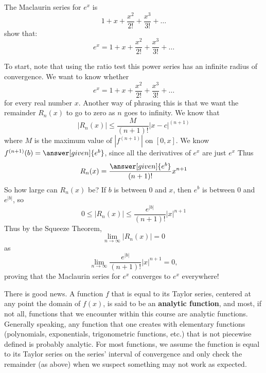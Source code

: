 \documentclass{ximera}
\begin{document}
\begin{example}
	The Maclaurin series for $e^x$ is 
	\[
	1+x+\frac{x^2}{2!} +\frac{x^3}{3!}+\dots
	\]
        show that:
        \[
        e^x = 1+x+\frac{x^2}{2!} +\frac{x^3}{3!}+\dots
        \]
	\begin{explanation}
	  To start, note that using the ratio test this power series
          has an infinite radius of convergence.  We want to know
          whether
          \[
          e^x = 1+x+\frac{x^2}{2!} +\frac{x^3}{3!}+\dots
          \]
          for every real number $x$.  Another way of phrasing this is
          that we want the remainder $R_n(x)$ to go to zero as $n$
          goes to infinity. We know that
          \[
          \left|R_n(x)\right| \le \frac{M}{(n+1)!}|x-c|^{(n+1)}
          \]
          where $M$ is the maximum value of $|f^{(n+1)}|$ on $[0,x]$.
          We know $f^{(n+1)}(b) = \answer[given]{e^b}$, since all the
          derivatives of $e^x$ are just $e^x$ Thus
	  \[
	  R_n(x) = \frac{\answer[given]{e^b}}{(n+1)!}x^{n+1}
	  \]
	  So how large can $R_n(x)$ be?  If $b$ is between $0$ and
          $x$, then $e^b$ is between $0$ and $e^{|b|}$, so
	  \[
	  0\le \left| R_n(x)\right| \leq \frac{e^{|b|}}{(n+1)!}|x|^{n+1}
	  \]
	  Thus by the Squeeze Theorem,
	  \[
	  \lim_{n \to \infty}\left| R_n(x)\right| = 0
          \]
          as
          \[
          \lim_{n \to \infty} \frac{e^{|b|}}{(n+1)!}|x|^{n+1} = 0,
	  \]
	  proving that the Maclaurin series for $e^x$ converges to
          $e^x$ everywhere!
        \end{explanation}
\end{example}

There is good news. A function $f$ that is equal to its Taylor series,
centered at any point the domain of $f(x)$, is said to be an
\textbf{analytic function}, and most, if not all, functions that we
encounter within this course are analytic functions. Generally
speaking, any function that one creates with elementary functions
(polynomials, exponentials, trigonometric functions, etc.) that is not
piecewise defined is probably analytic. For most functions, we assume
the function is equal to its Taylor series on the series' interval of
convergence and only check the remainder (as above) when we suspect
something may not work as expected.

\end{document}
